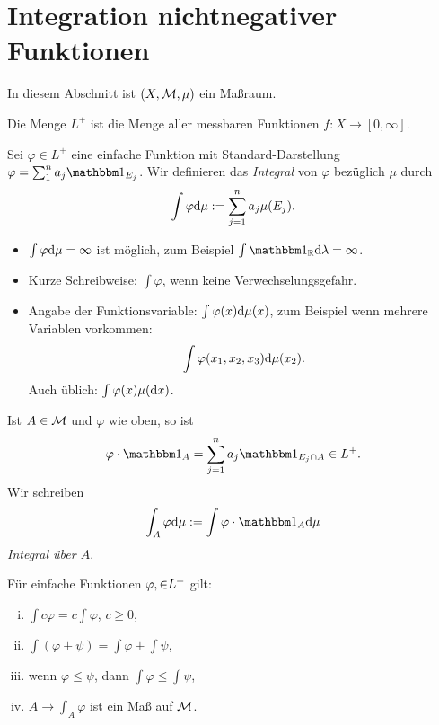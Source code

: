 \section{Integration nichtnegativer Funktionen}
In diesem Abschnitt ist $(X,\mathcal{M},\mu)$ ein Maßraum.

Die Menge $L^+$ ist die Menge aller messbaren Funktionen $f:X \to [0, \infty]$.

\begin{defn}
 Sei $\varphi \in L^+$ eine einfache Funktion mit Standard-Darstellung $\varphi = \sum_1^n a_j \ind_{E_j}$. Wir definieren das \emph{Integral} von $\varphi$ bezüglich $\mu$ durch
 \[ \int \varphi \mathrm{d} \mu := \sum_{j=1}^n a_j \mu( E_j ). \]
\end{defn}

\begin{rmrk*}
 \begin{itemize}
  \item $\int \varphi \mathrm{d} \mu = \infty$ ist möglich, zum Beispiel $\int \ind_\real \diffop \lambda = \infty$.
  \item Kurze Schreibweise: $\int \varphi$, wenn keine Verwechselungsgefahr.
  \item Angabe der Funktionsvariable: $\int \varphi(x) \mathrm{d} \mu(x)$, zum Beispiel wenn mehrere Variablen vorkommen:
  \[ \int \varphi( x_1, x_2, x_3 ) \mathrm{d} \mu(x_2). \]
  Auch üblich: $\int \varphi(x) \mu(\mathrm{d} x)$.
 \end{itemize}
\end{rmrk*}

Ist $A \in \mathcal{M}$ und $\varphi$ wie oben, so ist 
\[ \varphi \cdot \ind_A = \sum_{j=1}^n a_j \ind_{E_j \cap A} \in L^+. \]
Wir schreiben
\[ \int_A \varphi \diffop \mu := \int \varphi \cdot \ind_A \diffop \mu \]
\emph{Integral über $A$}.

\begin{lem}
 Für einfache Funktionen $\varphi, \si \in L^+$ gilt:
 \begin{enumerate}[(i)]
  \item $\int c \varphi = c \int \varphi$, $c \ge 0$,
  \item $\int(\varphi + \psi) = \int \varphi + \int \psi$,
  \item wenn $\varphi \le \psi$, dann $\int \varphi \le \int \psi$,
  \item $A \to \int_A \varphi$ ist ein Maß auf $\mathcal{M}$.
 \end{enumerate}
\end{lem}

